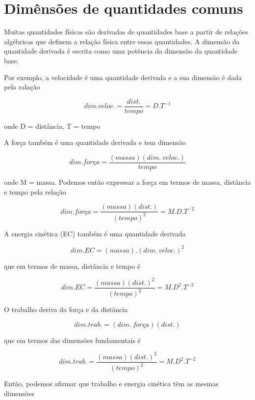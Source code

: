 \documentclass[
  portuguese,
  ]{book}
\begin{document}
\hypertarget{dimuxeansuxf5es-de-quantidades-comuns}{%
\section{Dimênsões de quantidades comuns}\label{dimuxeansuxf5es-de-quantidades-comuns}}

Muitas quantidades físicas são derivadas de quantidades base a partir de relações algébricas que definem a relação física entre essas quantidades. A dimensão da quantidade derivada é escrita como uma potência da dimensão da quantidade base.

Por exemplo, a velocidade é uma quantidade derivada e a sua dimensão é dada pela ralação

\[dim. veloc.=\frac{dist.}{tempo}=D.T^{-1}\]

onde D = distância, T = tempo

A força também é uma quantidade derivada e tem dimensão

\[dim. força =\frac{(massa)(dim.\ veloc.)}{tempo}\]

onde M = massa. Podemos então expressar a força em termos de massa, distância e tempo pela relação

\[dim. força=\frac{(massa)(dist.)}{(tempo)^2}=M.D.T^{-2}\]

A energia cinética (EC) também é uma quantidade derivada

\[dim. EC=(massa).(dim.\ veloc.)^2\]

que em termos de massa, distância e tempo é

\[dim. EC=\frac{(massa)(dist.)^2}{(tempo)^2}=M.D^2.T^{-2}\]

O trabalho deriva da força e da distância

\[dim. trab.=(dim.\ força)(dist.)\]

que em termos das dimensões fundamentais é

\[dim. trab.=\frac{(massa)(dist.)^2}{(tempo)^2}=M.D^2.T^{-2}\]

Então, podemos afirmar que trabalho e energia cinética têm as mesmas dimensões
\end{document}
